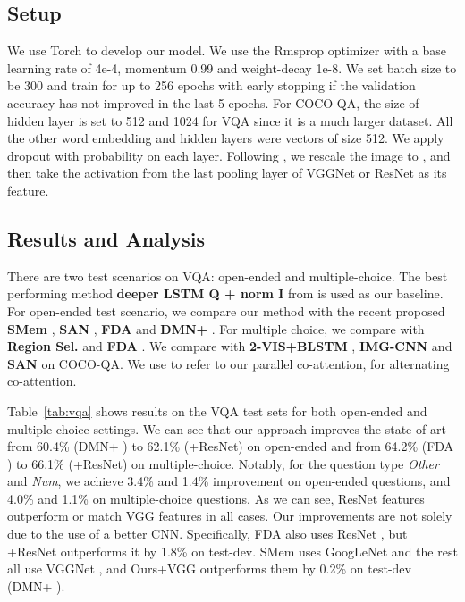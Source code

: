 \documentclass{article}
\begin{document}
\subsection{Setup}
We use Torch \cite{torch} to develop our model. We use the Rmsprop optimizer with a base learning rate of 4e-4, momentum 0.99 and weight-decay 1e-8. We set batch size to be 300 and train for up to 256 epochs with early stopping if the validation accuracy has not improved in the last 5 epochs. For COCO-QA, the size of hidden layer  is set to 512 and 1024 for VQA since it is a much larger dataset. All the other word embedding and hidden layers were vectors of size 512. We apply dropout with probability  on each layer. Following \cite{yang2015stacked}, we rescale the image to , and then take the activation from the last pooling layer of VGGNet \cite{Simonyan14c} or ResNet \cite{he2015deep} as its feature.
\subsection{Results and Analysis}
There are two test scenarios on VQA: open-ended and multiple-choice. The best performing method \textbf{deeper LSTM Q + norm I} from \cite{antol2015vqa} is used as our baseline. For open-ended test scenario, we compare our method with the recent proposed \textbf{SMem} \cite{xu2015ask}, \textbf{SAN} \cite{yang2015stacked}, \textbf{FDA} \cite{Ilievski2016} and \textbf{DMN+} \cite{xiong2016dynamic}. For multiple choice, we compare with \textbf{Region Sel.} \cite{shih2015look} and \textbf{FDA} \cite{Ilievski2016}. We compare with \textbf{2-VIS+BLSTM} \cite{ren2015exploring}, \textbf{IMG-CNN} \cite{ma2015learning} and \textbf{SAN} \cite{yang2015stacked} on COCO-QA. We use  to refer to our parallel co-attention,  for alternating co-attention.

Table~\ref{tab:vqa} shows results on the VQA test sets for both open-ended and multiple-choice settings. We can see that our approach improves the state of art from 60.4\% (DMN+ \cite{xiong2016dynamic}) to 62.1\% (+ResNet) on open-ended and from 64.2\% (FDA \cite{Ilievski2016}) to 66.1\% (+ResNet) on multiple-choice. Notably, for the question type \textit{Other} and \textit{Num}, we achieve 3.4\% and 1.4\% improvement on open-ended questions, and 4.0\% and 1.1\% on multiple-choice questions. As we can see, ResNet features outperform or match VGG features in all cases. Our improvements are not solely due to the use of a better CNN. Specifically, FDA \cite{Ilievski2016} also uses ResNet \cite{he2015deep}, but +ResNet outperforms it by 1.8\% on test-dev. SMem \cite{xu2015ask} uses GoogLeNet \cite{szegedy2015going} and the rest all use VGGNet \cite{Simonyan14c}, and Ours+VGG outperforms them by 0.2\% on test-dev (DMN+ \cite{xiong2016dynamic}). 
\end{document}

